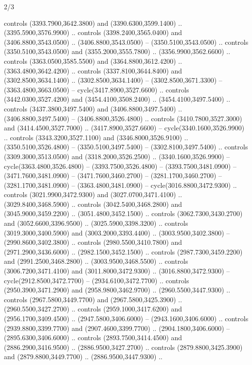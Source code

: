 \begin{flagdescription}{2/3}
\begin{scope}[shift={(0.5\flaglength,0.5)},scale=\flagwidth/130]
\begin{scope}[y=0.01mm, x=0.01mm,shift={(-3365,-2250)}]
  controls (3393.7900,3642.3800) and (3390.6300,3599.1400) ..
  (3395.5900,3576.9900) .. controls (3398.2400,3565.0400) and
  (3406.8800,3543.0500) .. (3406.8800,3543.0500) -- (3350.5100,3543.0500) ..
  controls (3350.5100,3543.0500) and (3355.2000,3555.7800) ..
  (3356.9900,3562.6600) .. controls (3363.0500,3585.5500) and
  (3364.8800,3612.4200) .. (3363.4800,3642.4200) .. controls
  (3337.8100,3644.8400) and (3302.8500,3634.1400) .. (3302.8500,3634.1400) --
  (3302.8500,3671.3300) -- (3363.4800,3663.0500) -- cycle(3417.8900,3527.6600)
  .. controls (3442.0300,3527.4200) and (3454.4100,3508.2400) ..
  (3454.4100,3497.5400) .. controls (3437.3800,3497.5400) and
  (3406.8800,3497.5400) .. (3406.8800,3497.5400) -- (3406.8800,3526.4800) ..
  controls (3410.7800,3527.3000) and (3414.4500,3527.7000) ..
  (3417.8900,3527.6600) -- cycle(3340.1600,3526.9900) .. controls
  (3343.3200,3527.1100) and (3346.8000,3526.9100) .. (3350.5100,3526.4800) --
  (3350.5100,3497.5400) -- (3302.8100,3497.5400) .. controls
  (3309.3000,3513.0500) and (3318.2000,3526.2500) .. (3340.1600,3526.9900) --
  cycle(3363.4800,3526.4800) -- (3393.7500,3526.4800) -- (3393.7500,3481.0900)
  -- (3471.7600,3481.0900) -- (3471.7600,3460.2700) -- (3281.1700,3460.2700) --
  (3281.1700,3481.0900) -- (3363.4800,3481.0900) -- cycle(3016.8800,3472.9300)
  .. controls (3021.9900,3472.9300) and (3027.0700,3471.4100) ..
  (3029.8400,3468.5900) .. controls (3042.5400,3468.2800) and
  (3045.9000,3459.2200) .. (3051.4800,3452.1500) .. controls
  (3062.7300,3430.2700) and (3052.6600,3396.9500) .. (3025.5900,3398.3200) ..
  controls (3019.3000,3400.5900) and (3003.2000,3393.4400) ..
  (3003.9500,3402.3800) -- (2990.8600,3402.3800) .. controls
  (2980.5500,3410.7800) and (2971.2900,3436.6000) .. (2982.1500,3452.1500) ..
  controls (2987.7300,3459.2200) and (2991.2500,3468.2800) ..
  (3003.9500,3468.5500) .. controls (3006.7200,3471.4100) and
  (3011.8000,3472.9300) .. (3016.8800,3472.9300) -- cycle(2912.8500,3472.7700)
  -- (2934.6100,3472.7700) .. controls (2950.3900,3471.2900) and
  (2958.9800,3462.9700) .. (2960.5500,3447.9300) .. controls
  (2967.5800,3449.7700) and (2967.5800,3425.3900) .. (2960.5500,3427.2700) ..
  controls (2959.1000,3417.6200) and (2956.1700,3409.4500) ..
  (2947.5800,3406.6000) -- (2943.1600,3406.6000) .. controls
  (2939.8800,3399.7700) and (2907.4600,3399.7700) .. (2904.1800,3406.6000) --
  (2895.6300,3406.6000) .. controls (2893.7500,3414.4500) and
  (2886.2900,3416.9500) .. (2886.9500,3427.2700) .. controls
  (2879.8800,3425.3900) and (2879.8800,3449.7700) .. (2886.9500,3447.9300) ..

\end{scope}
\end{scope}
\end{flagdescription}
